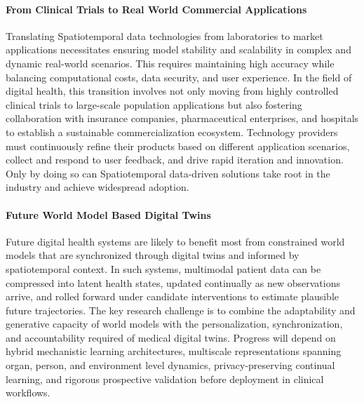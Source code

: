 \documentclass[acmsmall]{acmart}
\begin{document}
\paragraph{From Clinical Trials to Real World Commercial Applications}
Translating Spatiotemporal data technologies from laboratories to market applications necessitates ensuring model stability and scalability in complex and dynamic real-world scenarios. This requires maintaining high accuracy while balancing computational costs, data security, and user experience. In the field of digital health, this transition involves not only moving from highly controlled clinical trials to large-scale population applications but also fostering collaboration with insurance companies, pharmaceutical enterprises, and hospitals to establish a sustainable commercialization ecosystem. Technology providers must continuously refine their products based on different application scenarios, collect and respond to user feedback, and drive rapid iteration and innovation. Only by doing so can Spatiotemporal data-driven solutions take root in the industry and achieve widespread adoption.

\paragraph{Future World Model Based Digital Twins}
Future digital health systems are likely to benefit most from constrained world models that are synchronized through digital twins and informed by spatiotemporal context. In such systems, multimodal patient data can be compressed into latent health states, updated continually as new observations arrive, and rolled forward under candidate interventions to estimate plausible future trajectories. The key research challenge is to combine the adaptability and generative capacity of world models with the personalization, synchronization, and accountability required of medical digital twins. Progress will depend on hybrid mechanistic learning architectures, multiscale representations spanning organ, person, and environment level dynamics, privacy-preserving continual learning, and rigorous prospective validation before deployment in clinical workflows.\cite{DeDomenico2025ComplexSystems}
%  


\end{document}
